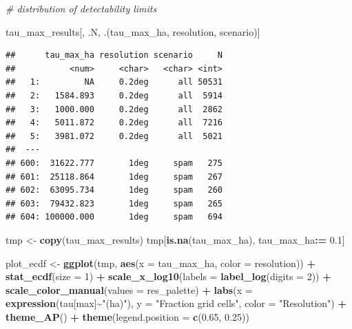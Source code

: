 \documentclass[
  11pt,
]{article}
\newenvironment{Shaded}{\begin{snugshade}}{\end{snugshade}}
\newcommand{\AttributeTok}[1]{\textcolor[rgb]{0.13,0.29,0.53}{#1}}
\newcommand{\CommentTok}[1]{\textcolor[rgb]{0.56,0.35,0.01}{\textit{#1}}}
\newcommand{\DecValTok}[1]{\textcolor[rgb]{0.00,0.00,0.81}{#1}}
\newcommand{\FloatTok}[1]{\textcolor[rgb]{0.00,0.00,0.81}{#1}}
\newcommand{\FunctionTok}[1]{\textcolor[rgb]{0.13,0.29,0.53}{\textbf{#1}}}
\newcommand{\NormalTok}[1]{#1}
\newcommand{\OtherTok}[1]{\textcolor[rgb]{0.56,0.35,0.01}{#1}}
\newcommand{\SpecialCharTok}[1]{\textcolor[rgb]{0.81,0.36,0.00}{\textbf{#1}}}
\newcommand{\StringTok}[1]{\textcolor[rgb]{0.31,0.60,0.02}{#1}}
\begin{document}
\begin{Shaded}
\begin{Highlighting}[]
\CommentTok{\# distribution of detectability limits}

\NormalTok{tau\_max\_results[, .N, .(tau\_max\_ha, resolution, scenario)]}
\end{Highlighting}
\end{Shaded}

\begin{verbatim}
##      tau_max_ha resolution scenario     N
##           <num>     <char>   <char> <int>
##   1:         NA     0.2deg      all 50531
##   2:   1584.893     0.2deg      all  5914
##   3:   1000.000     0.2deg      all  2862
##   4:   5011.872     0.2deg      all  7216
##   5:   3981.072     0.2deg      all  5021
##  ---                                     
## 600:  31622.777       1deg     spam   275
## 601:  25118.864       1deg     spam   267
## 602:  63095.734       1deg     spam   260
## 603:  79432.823       1deg     spam   265
## 604: 100000.000       1deg     spam   694
\end{verbatim}

\begin{Shaded}
\begin{Highlighting}[]
\NormalTok{tmp }\OtherTok{\textless{}{-}} \FunctionTok{copy}\NormalTok{(tau\_max\_results)}
\NormalTok{tmp[}\FunctionTok{is.na}\NormalTok{(tau\_max\_ha), tau\_max\_ha}\SpecialCharTok{:=} \FloatTok{0.1}\NormalTok{]}

\NormalTok{plot\_ecdf }\OtherTok{\textless{}{-}} \FunctionTok{ggplot}\NormalTok{(tmp, }\FunctionTok{aes}\NormalTok{(}\AttributeTok{x =}\NormalTok{ tau\_max\_ha, }\AttributeTok{color =}\NormalTok{ resolution)) }\SpecialCharTok{+}
  \FunctionTok{stat\_ecdf}\NormalTok{(}\AttributeTok{size =} \DecValTok{1}\NormalTok{) }\SpecialCharTok{+}
  \FunctionTok{scale\_x\_log10}\NormalTok{(}\AttributeTok{labels =} \FunctionTok{label\_log}\NormalTok{(}\AttributeTok{digits =} \DecValTok{2}\NormalTok{)) }\SpecialCharTok{+}
  \FunctionTok{scale\_color\_manual}\NormalTok{(}\AttributeTok{values =}\NormalTok{ res\_palette) }\SpecialCharTok{+}
  \FunctionTok{labs}\NormalTok{(}\AttributeTok{x =} \FunctionTok{expression}\NormalTok{(tau[max]}\SpecialCharTok{\textasciitilde{}}\StringTok{"(ha)"}\NormalTok{), }\AttributeTok{y =} \StringTok{"Fraction grid cells"}\NormalTok{,}
       \AttributeTok{color =} \StringTok{"Resolution"}\NormalTok{) }\SpecialCharTok{+}
  \FunctionTok{theme\_AP}\NormalTok{() }\SpecialCharTok{+}
  \FunctionTok{theme}\NormalTok{(}\AttributeTok{legend.position =} \FunctionTok{c}\NormalTok{(}\FloatTok{0.65}\NormalTok{, }\FloatTok{0.25}\NormalTok{))}
\end{Highlighting}
\end{Shaded}
\end{document}
